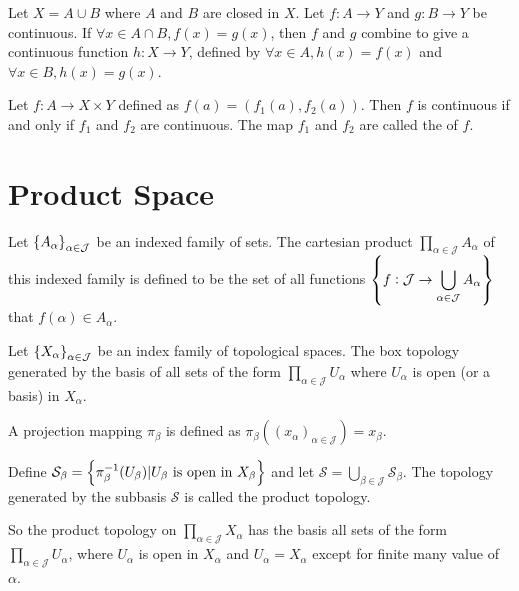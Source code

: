 \begin{theorem}
    Let $X = A \cup B$ where $A$ and $B$ are closed in $X$. Let $f: A \rightarrow Y$ and $g: B \rightarrow Y$ be continuous. If $\forall x \in A \cap B, f(x) = g(x)$, then $f$ and $g$ combine to give a continuous function $h: X \rightarrow Y$, defined by $\forall x \in A, h(x) = f(x) $ and $\forall x \in B , h(x) = g(x)$.
\end{theorem}

\begin{theorem}
Let $f: A \rightarrow X \times Y$ defined as $f(a) = \left(f_1(a), f_2(a) \right)$. Then $f$ is continuous if and only if $f_1$ and $f_2$ are continuous. The map $f_1$ and $f_2$ are called the  of $f$.
\end{theorem}


\section{Product Space}

\begin{definition}
    Let $\set{A_{\alpha}}_{\alpha \in \mathcal{J}}$ be an indexed family of sets. The cartesian product $\displaystyle \prod_{\alpha \in \mathcal{J}} A_{\alpha}$ of this indexed family is defined to be the set of all functions $\set{f : \mathcal{J} \rightarrow \displaystyle \bigcup_{\alpha \in \mathcal{J}} A_{\alpha}}$ that $f(\alpha) \in A_{\alpha}$.
\end{definition}

\begin{definition}
    Let $\set{X_{\alpha}}_{\alpha \in \mathcal{J}}$ be an index family of topological spaces. The box topology generated by the basis of all sets of the form $\displaystyle \prod_{\alpha \in \mathcal{J}} U_{\alpha}$ where $U_{\alpha}$ is open (or a basis) in $X_{\alpha}$. 
\end{definition}

\begin{definition}
    A projection mapping $\pi_\beta$ is defined as $\pi_\beta \left( (x_{\alpha})_{\alpha \in \mathcal{J}} \right) = x_\beta$.
\end{definition}

\begin{definition}
    Define $\mathcal{S}_{\beta} = \set{\pi_{\beta}^{-1}(U_{\beta}) | U_{\beta}\text{ is open in }X_{\beta}}$ and let $\mathcal{S} = \displaystyle \bigcup_{\beta \in \mathcal{J}} \mathcal{S}_{\beta}$. The topology generated by the subbasis $\mathcal{S}$ is called the product topology. 
    
    So the product topology on $\displaystyle \prod_{\alpha \in \mathcal{J}} X_{\alpha}$ has the basis all sets of the form $\displaystyle \prod_{\alpha \in \mathcal{J}} U_{\alpha}$, where $U_{\alpha}$ is open in $X_{\alpha}$ and $U_{\alpha} = X_{\alpha}$ except for finite many value of $\alpha$.
\end{definition}

